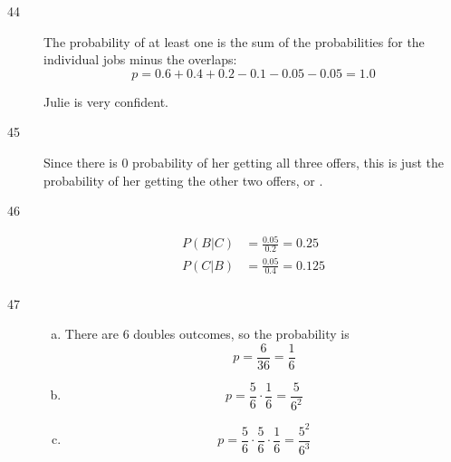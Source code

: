\documentclass[letterpaper, landscape]{exam}
\begin{document}
\begin{description}



    \item[44]
      The probability of at least one is the sum of the probabilities for the individual
      jobs minus the overlaps:
        \[
          p = 0.6 + 0.4 + 0.2 - 0.1 - 0.05 - 0.05 = \boxed{ 1.0 }
        \]

        Julie is very confident.

    \item[45]
      Since there is 0 probability of her getting all three offers, this is just the
      probability of her getting the other two offers, or .

    \item[46]
      \begin{align*}
        P(B|C) &= \frac{0.05}{0.2} = \boxed{ 0.25 } \\
        P(C|B) &= \frac{0.05}{0.4} = \boxed{ 0.125 } \\
      \end{align*}

    \item[47]
      \begin{enumerate}[(a)]
        \item There are 6 doubles outcomes, so the probability is
          \[
            p = \frac{6}{36} = \boxed{ \frac{1}{6} }
          \]

        \item 
          \[
            p = \frac{5}{6} \cdot \frac{1}{6} = \boxed{ \frac{5}{6^2} }
          \]

        \item 
          \[
            p = \frac{5}{6} \cdot \frac{5}{6} \cdot \frac{1}{6} 
              = \boxed{ \frac{5^2}{6^3} }
          \]


\end{enumerate}
\end{description}
\end{document}
